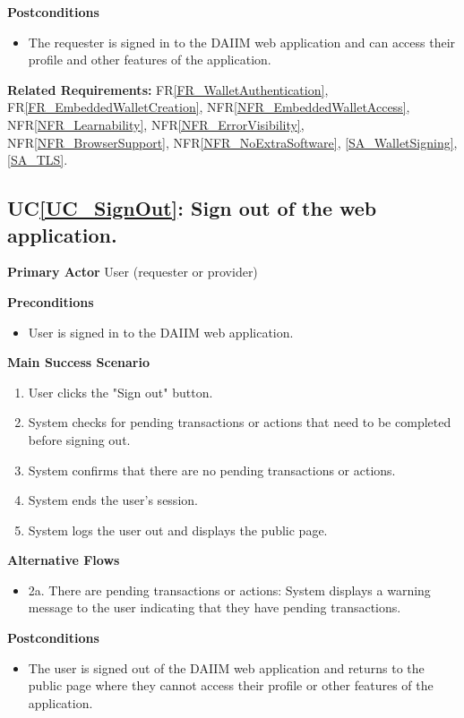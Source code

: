 \documentclass[12pt]{article}
\newcounter{ucnum} %
\newcommand{\ucref}[1]{UC\ref{#1}}
\newcommand{\rref}[1]{FR\ref{#1}}
\newcommand{\nfrref}[1]{NFR\ref{#1}}
\begin{document}
\textbf{Postconditions}
\begin{itemize}
\item The requester is signed in to the DAIIM web application and can access their profile and other features of the application.
\end{itemize}

\textbf{Related Requirements:} \rref{FR_WalletAuthentication}, \rref{FR_EmbeddedWalletCreation}, \nfrref{NFR_EmbeddedWalletAccess}, \nfrref{NFR_Learnability}, \nfrref{NFR_ErrorVisibility}, \nfrref{NFR_BrowserSupport}, \nfrref{NFR_NoExtraSoftware}, \ref{SA_WalletSigning}, \ref{SA_TLS}.


 \label{UC_SignOut}
\subsection{\ucref{UC_SignOut}: Sign out of the web application.}

\textbf{Primary Actor}
User (requester or provider)

\textbf{Preconditions}
\begin{itemize}
\item User is signed in to the DAIIM web application.
\end{itemize}

\textbf{Main Success Scenario}
\begin{enumerate}
\item User clicks the "Sign out" button.
\item System checks for pending transactions or actions that need to be completed before signing out.
\item System confirms that there are no pending transactions or actions.
\item System ends the user's session.
\item System logs the user out and displays the public page.

\end{enumerate}

\textbf{Alternative Flows}
\begin{itemize}
\item 2a. There are pending transactions or actions: System displays a warning message to the user indicating that they have pending transactions.
\end{itemize}

\textbf{Postconditions}
\begin{itemize}
\item The user is signed out of the DAIIM web application and returns to the public page where they cannot access their profile or other features of the application.
\end{itemize}
\end{document}
